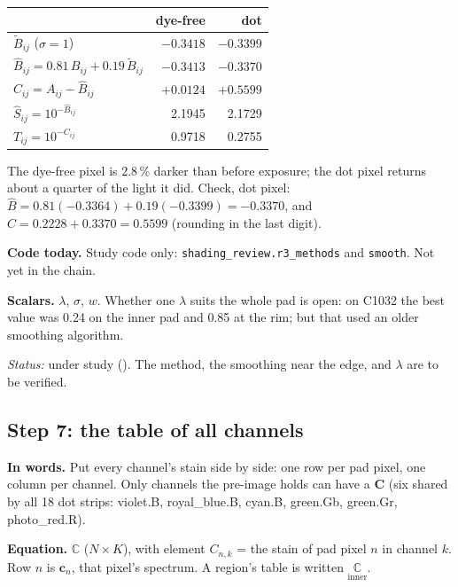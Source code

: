 \documentclass[11pt,letter]{article}
\newcommand{\file}[1]{\texttt{\seqsplit{#1}}}
\newcommand{\code}[1]{\texttt{#1}}
\newcommand{\status}[1]{\par\noindent\textit{Status:} #1\par}
\newcommand{\mC}{\mathbf{C}}   %
\newcommand{\tC}{\mathbb{C}}
\newcommand{\vc}{\mathbf{c}}           %
\newcommand{\reg}[2]{\underset{\text{#1}}{#2}}
\begin{document}
\medskip
\begin{center}
\begin{tabular}{@{}lrr@{}}
\toprule
 & dye-free & dot \\
\midrule
$\widetilde B_{ij}$ ($\sigma = 1$) & $-0.3418$ & $-0.3399$ \\
$\widehat B_{ij} = 0.81\,B_{ij} + 0.19\,\widetilde B_{ij}$ & $-0.3413$ & $-0.3370$ \\
$C_{ij} = A_{ij} - \widehat B_{ij}$ & $+0.0124$ & $+0.5599$ \\
$\widehat S_{ij} = 10^{-\widehat B_{ij}}$ & 2.1945 & 2.1729 \\
$T_{ij} = 10^{-C_{ij}}$ & 0.9718 & 0.2755 \\
\bottomrule
\end{tabular}
\end{center}

\noindent The dye-free pixel is 2.8\,\% darker than before exposure; the
dot pixel returns about a quarter of the light it did.  Check, dot pixel:
$\widehat B = 0.81(-0.3364) + 0.19(-0.3399) = -0.3370$, and
$C = 0.2228 + 0.3370 = 0.5599$ (rounding in the last digit).

\textbf{Code today.}  Study code only: \code{shading\_review.r3\_methods}
and \code{smooth}.  Not yet in the chain.

\textbf{Scalars.}  $\lambda$, $\sigma$, $w$.  Whether one $\lambda$ suits the
whole pad is open: on C1032 the best value was 0.24 on the inner pad and
0.85 at the rim; but that used an older smoothing algorithm.

\status{under study (\file{shading\_removal.tex}).  The method, the
smoothing near the edge, and $\lambda$ are to be verified.}

\subsection{Step 7: the table of all channels}

\textbf{In words.}  Put every channel's stain side by side: one row per pad
pixel, one column per channel.  Only channels the pre-image holds can have
a $\mC$ (six shared by all 18 dot strips: violet.B, royal\_blue.B, cyan.B,
green.Gb, green.Gr, photo\_red.R).

\textbf{Equation.}  $\tC$ ($N \times K$), with element $C_{n,k}$ = the
stain of pad pixel $n$ in channel $k$.  Row $n$ is $\vc_n$, that pixel's
spectrum.  A region's table is written $\reg{inner}{\tC}$.
\end{document}
